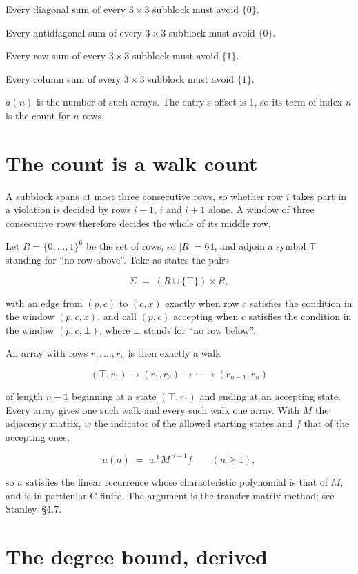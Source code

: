 \documentclass[11pt]{article}
\theoremstyle{definition}
\begin{document}
Every diagonal sum of every $3\times3$ subblock must avoid $\{0\}$.

Every antidiagonal sum of every $3\times3$ subblock must avoid $\{0\}$.

Every row sum of every $3\times3$ subblock must avoid $\{1\}$.

Every column sum of every $3\times3$ subblock must avoid $\{1\}$.

$a(n)$ is the number of such arrays. The entry's offset is 1, so its term of index $n$ is the count for $n$ rows.

\section{The count is a walk count}

A subblock spans at most three consecutive rows, so whether row $i$ takes part in a violation is decided by rows $i-1$, $i$ and $i+1$ alone. A window of three consecutive rows therefore decides the whole of its middle row.

Let $R = \{0,\dots,1\}^{6}$ be the set of rows, so $|R| = 64$, and adjoin a symbol $\top$ standing for ``no row above''. Take as states the pairs

\[\Sigma \;=\; (R \cup \{\top\}) \times R,\]

with an edge from $(p,c)$ to $(c,x)$ exactly when row $c$ satisfies the condition in the window $(p,c,x)$, and call $(p,c)$ accepting when $c$ satisfies the condition in the window $(p,c,\bot)$, where $\bot$ stands for ``no row below''.

An array with rows $r_1,\dots,r_n$ is then exactly a walk

\[(\top,r_1) \to (r_1,r_2) \to \cdots \to (r_{n-1},r_n)\]

of length $n-1$ beginning at a state $(\top,r_1)$ and ending at an accepting state. Every array gives one such walk and every such walk one array. With $M$ the adjacency matrix, $w$ the indicator of the allowed starting states and $f$ that of the accepting ones,

\[a(n) \;=\; w^{\mathsf T} M^{\,n-1} f \qquad (n \ge 1),\]

so $a$ satisfies the linear recurrence whose characteristic polynomial is that of $M$, and is in particular C-finite. The argument is the transfer-matrix method; see Stanley~\S4.7.

\section{The degree bound, derived}
\end{document}
